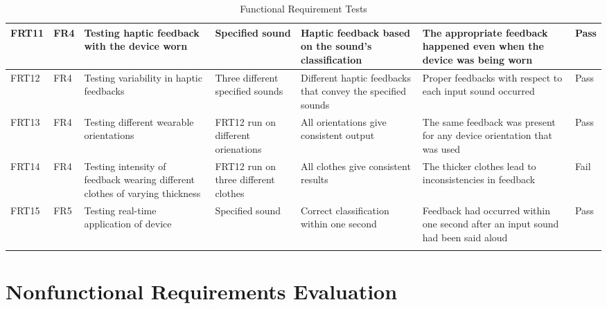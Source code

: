 \documentclass[12pt, titlepage]{article}
\begin{document}
\begin{longtable}{|p{1.2cm}|p{0.9cm}|p{2.5cm}|p{1.5cm}|p{2.5cm}|p{2cm}|p{1.2cm}|}
  FRT11       & FR4          & Testing haptic feedback with the device worn                                 & Specified sound                                   & Haptic feedback based on the sound's classification         &          The appropriate feedback happened even when the device was being worn              &                   {\color[HTML]{32CB00} Pass}                                 \\ \hline
  FRT12       & FR4          & Testing variability in haptic feedbacks                                      & Three different specified sounds                  & Different haptic feedbacks that convey the specified sounds &          Proper feedbacks with respect to each input sound occurred              &                              {\color[HTML]{32CB00} Pass}                      \\ \hline
  FRT13       & FR4          & Testing different wearable orientations                                      & FRT12 run on different orienations                & All orientations give consistent output                     &          The same feedback was present for any device orientation that was used              &                 {\color[HTML]{32CB00} Pass}                                   \\ \hline
  FRT14       & FR4          & Testing intensity of feedback wearing different clothes of varying thickness & FRT12 run on three different clothes              & All clothes give consistent results                         &          The thicker clothes lead to inconsistencies in feedback              &                      {\color[HTML]{FE0000} Fail}                              \\ \hline
  FRT15       & FR5          & Testing real-time application of device                                      & Specified sound                                   & Correct classification within one second                    &          Feedback had occurred within one second after an input sound had been said aloud              &                  {\color[HTML]{32CB00} Pass}                                  \\ \hline
  \caption{Functional Requirement Tests}
  \label{functionalRequirementTests}
\end{longtable}

\section{Nonfunctional Requirements Evaluation}
\end{document}
